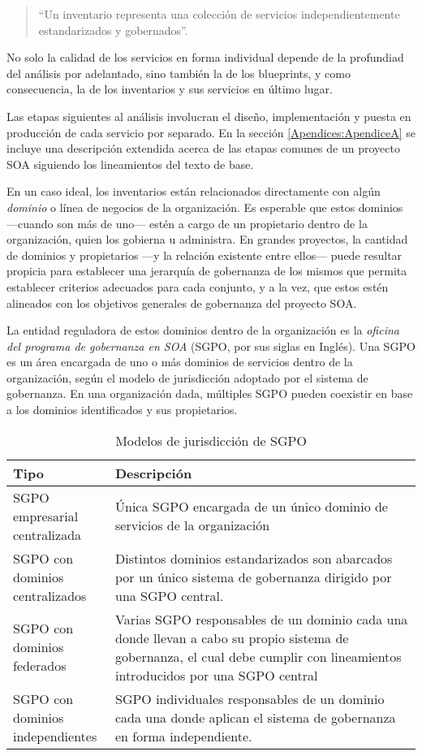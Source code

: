   \begin{quote}
    ``Un inventario representa una colección de servicios independientemente estandarizados y gobernados''. \cite{Erl:2011:SGG:1983453}
  \end{quote}

  No solo la calidad de los servicios en forma individual depende de la profundiad del análisis por adelantado, sino también la de los blueprints, y como consecuencia, la de los inventarios y sus servicios en último lugar.

  Las etapas siguientes al análisis involucran el diseño, implementación y puesta en producción de cada servicio por separado. En la sección \ref{Apendices:ApendiceA} se incluye una descripción extendida acerca de las etapas comunes de un proyecto SOA siguiendo los lineamientos del texto de base.

  En un caso ideal, los inventarios están relacionados directamente con algún \emph{dominio} o línea de negocios de la organización. Es esperable que estos dominios —cuando son más de uno— estén a cargo de un propietario dentro de la organización, quien los gobierna u administra. En grandes proyectos, la cantidad de dominios y propietarios —y la relación existente entre ellos— puede resultar propicia para establecer una jerarquía de gobernanza de los mismos que permita establecer criterios adecuados para cada conjunto, y a la vez, que estos estén alineados con los objetivos generales de gobernanza del proyecto SOA.

  La entidad reguladora de estos dominios dentro de la organización es la \emph{oficina del programa de gobernanza en SOA} (SGPO, por sus siglas en Inglés). Una SGPO es un área encargada de uno o más dominios de servicios dentro de la organización, según el modelo de jurisdicción adoptado por el sistema de gobernanza. En una organización dada, múltiples SGPO pueden coexistir en base a los dominios identificados y sus propietarios.

  \begin{table}[h]
    \begin{tabular}{p{0.25\linewidth} | p{0.75\linewidth}}
      \textbf{Tipo} & \textbf{Descripción} \\
      \hline
      SGPO empresarial centralizada & Única SGPO encargada de un único dominio de servicios de la organización\\
      \hline
      SGPO con dominios centralizados & Distintos dominios estandarizados son abarcados por un único sistema de gobernanza dirigido por una SGPO central.\\
      \hline
      SGPO con dominios federados & Varias SGPO responsables de un dominio cada una donde llevan a cabo su propio sistema de gobernanza, el cual debe cumplir con lineamientos introducidos por una SGPO central\\
      \hline
      SGPO con dominios independientes & SGPO individuales responsables de un dominio cada una donde aplican el sistema de gobernanza en forma independiente.\\
      \hline
    \end{tabular}
    \caption{Modelos de jurisdicción de SGPO}
    \label{tabla:modelos_sgpo}
  \end{table}

